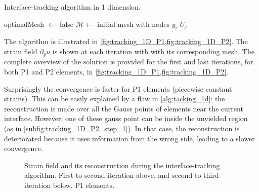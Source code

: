 \documentclass[11 pt]{report}
\begin{document}
\begin{algorithm}[t]
    \caption{Interface-tracking algorithm in 1 dimension.}
    \label{alg:tacking_1d}
    optimalMesh $\gets$ false\;
    $\mathcal{M} \gets $ initial mesh with nodes $y_i$\;
    \Return $U_j$ 
\end{algorithm}

The algorithm is illustrated in \cref{fig:tracking_1D_P1,fig:tracking_1D_P2}. The strain field $\partial_y u$ is shown at each iteration with with its corresponding mesh. The complete overview of the solution is provided for the first and last iterations, for both P1 and P2 elements, in \cref{fig:tracking_1D_P1,fig:tracking_1D_P2}.

Surprisingly the convergence is faster for P1 elements (piecewise constant strains). This can be easily explained by a flaw in \cref{alg:tacking_1d}: the reconstruction is made over all the Gauss points of elements near the current interface. However, one of these gauss point can be inside the unyielded region (as in \cref{subfig:tracking_1D_P2_step_1}). In that case, the reconstruction is deteriorated because it uses information from the wrong side, leading to a slower convergence.

\begin{figure}[b]
    \centering
    \begin{subfigure}[t]{\textwidth}
        
    \end{subfigure}
    \begin{subfigure}[t]{\textwidth}
        
    \end{subfigure}
    \caption{Strain field and its reconstruction during the interface-tracking algorithm. First to second iteration above, and second to third iteration below. P1 elements.}
    \label{fig:tracking_1D_P1_steps}
\end{figure}
\end{document}
